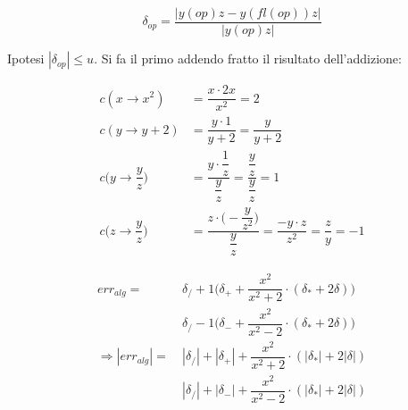 \begin{equation*}
  \delta_{op} = \dfrac{|y(op)z - y(fl(op))z|}{|y(op)z|}
\end{equation*}

Ipotesi $|\delta_{op}|\leq u$. Si fa il primo addendo fratto il risultato dell'addizione:

\begin{equation*}
\begin{split}
  c(x\rightarrow x^2) &= \dfrac{x\cdot 2x}{x^2} = 2\\[1.5ex]
  c(y\rightarrow y+2) &= \dfrac{y\cdot 1}{y+2} = \dfrac{y}{y+2}\\[1.5ex]
  c\Big(y\rightarrow \dfrac{y}{z}\Big) &= \dfrac{y\cdot \dfrac{1}{z}}{\dfrac{y}{z}} = \dfrac{\dfrac{y}{z}}{\dfrac{y}{z}} = 1\\[1.5ex]
  c\Big(z\rightarrow \dfrac{y}{z}\Big) &= \dfrac{z\cdot \Big(-\dfrac{y}{z^2}\Big)}{\dfrac{y}{z}} = \dfrac{-y\cdot z}{z^2} = \dfrac{z}{y} = -1
\end{split}
\end{equation*}

\begin{center}
\end{center}

\begin{equation*}
\begin{split}
  err_{alg} = &~ \delta_/ +1\Big(\delta_+ +\dfrac{x^2}{x^2+2}\cdot (\delta_* +2\delta)\Big)\\[1.5ex]
  &~ \delta_/ -1\Big(\delta_- +\dfrac{x^2}{x^2-2}\cdot (\delta_* +2\delta)\Big)\\[1.5ex]
  \Rightarrow |err_{alg}| = &~ |\delta_/| + |\delta_+| + \dfrac{x^2}{x^2+2}\cdot (|\delta_*|+2|\delta|)\\[1.5ex]
  &~ |\delta_/| + |\delta_-| + \dfrac{x^2}{x^2-2}\cdot (|\delta_*|+2|\delta|)
\end{split}
\end{equation*}

